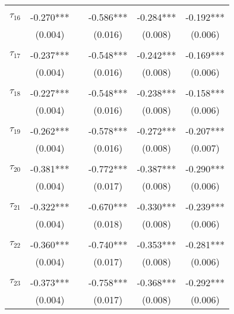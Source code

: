 \begin{tabular}{@{\extracolsep{-5pt}}lccccc}
                &           &&           &           &           \\[-2.1ex]
$\tau_{16}$     & -0.270*** && -0.586*** & -0.284*** & -0.192*** \\
                &  (0.004)  &&  (0.016)  &  (0.008)  &  (0.006)  \\
                &           &&           &           &           \\[-2.1ex]
$\tau_{17}$     & -0.237*** && -0.548*** & -0.242*** & -0.169*** \\
                &  (0.004)  &&  (0.016)  &  (0.008)  &  (0.006)  \\
                &           &&           &           &           \\[-2.1ex]
$\tau_{18}$     & -0.227*** && -0.548*** & -0.238*** & -0.158*** \\
                &  (0.004)  &&  (0.016)  &  (0.008)  &  (0.006)  \\
                &           &&           &           &           \\[-2.1ex]
$\tau_{19}$     & -0.262*** && -0.578*** & -0.272*** & -0.207*** \\
                &  (0.004)  &&  (0.016)  &  (0.008)  &  (0.007)  \\
                &           &&           &           &           \\[-2.1ex]
$\tau_{20}$     & -0.381*** && -0.772*** & -0.387*** & -0.290*** \\
                &  (0.004)  &&  (0.017)  &  (0.008)  &  (0.006)  \\
                &           &&           &           &           \\[-2.1ex]
$\tau_{21}$     & -0.322*** && -0.670*** & -0.330*** & -0.239*** \\
                &  (0.004)  &&  (0.018)  &  (0.008)  &  (0.006)  \\
                &           &&           &           &           \\[-2.1ex]
$\tau_{22}$     & -0.360*** && -0.740*** & -0.353*** & -0.281*** \\
                &  (0.004)  &&  (0.017)  &  (0.008)  &  (0.006)  \\
                &           &&           &           &           \\[-2.1ex]
$\tau_{23}$     & -0.373*** && -0.758*** & -0.368*** & -0.292*** \\
                &  (0.004)  &&  (0.017)  &  (0.008)  &  (0.006)  \\

\end{tabular}
